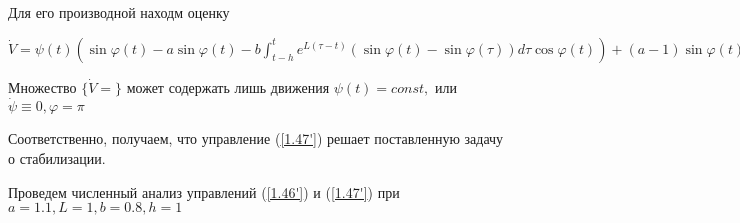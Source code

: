 Для его производной находм оценку

$\dot V = \psi (t) (\sin \varphi (t) - a \sin \varphi (t) - b \int_{t-h}^{t} e^{L (\tau - t)} (\sin \varphi (t) - \sin \varphi (\tau)) d \tau \cos \varphi (t)) + (a - 1) \sin \varphi (t) \psi (t) - \frac12 b e^{- L h} (\sin \varphi (t) - \sin \varphi (t - h))^2 + \cos \varphi (t) \int_{t-h}^{t} b e^{L (\tau - t)} (\sin \varphi (t) - \sin \varphi (\tau)) d \tau - \frac12 b L \int_{t-h}^{t} e^{L (\tau - t)} (\sin \varphi (t) - \sin \varphi (\tau))^2 d \tau = - \frac12 b e^{- L h} (\sin \varphi (t) - \sin \varphi (t - h))^2 - \frac12 b L \int_{t-h}^{t} e^{L (\tau - t)} (\sin \varphi (t) - \sin \varphi (\tau))^2 d \tau \le 0$

Множество $\lbrace \dot V = \rbrace$ может содержать лишь движения $\psi (t) = const,$ или $\dot \psi \equiv 0, \varphi = \pi$

Соответственно, получаем, что управление (\ref{1.47'}) решает поставленную задачу о стабилизации.

Проведем численный анализ управлений (\ref{1.46'}) и (\ref{1.47'}) при $a = 1.1, L = 1, b = 0.8, h = 1$